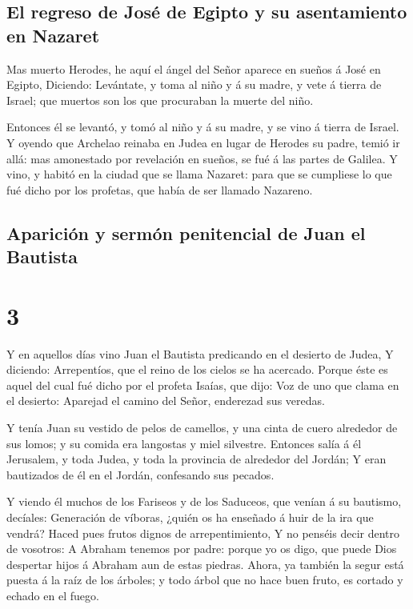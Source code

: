 \hypertarget{el-regreso-de-josuxe9-de-egipto-y-su-asentamiento-en-nazaret}{%
\subsection{El regreso de José de Egipto y su asentamiento en
Nazaret}\label{el-regreso-de-josuxe9-de-egipto-y-su-asentamiento-en-nazaret}}

 Mas muerto Herodes, he aquí el ángel del Señor aparece en
sueños á José en Egipto,  Diciendo: Levántate, y toma al
niño y á su madre, y vete á tierra de Israel; que muertos son los que
procuraban la muerte del niño.

 Entonces él se levantó, y tomó al niño y á su madre, y se
vino á tierra de Israel.  Y oyendo que Archelao reinaba en
Judea en lugar de Herodes su padre, temió ir allá: mas amonestado por
revelación en sueños, se fué á las partes de Galilea.  Y
vino, y habitó en la ciudad que se llama Nazaret: para que se cumpliese
lo que fué dicho por los profetas, que había de ser llamado Nazareno.

\hypertarget{apariciuxf3n-y-sermuxf3n-penitencial-de-juan-el-bautista}{%
\subsection{Aparición y sermón penitencial de Juan el
Bautista}\label{apariciuxf3n-y-sermuxf3n-penitencial-de-juan-el-bautista}}

\hypertarget{section-2}{%
\section{3}\label{section-2}}

 Y en aquellos días vino Juan el Bautista predicando en el
desierto de Judea,  Y diciendo: Arrepentíos, que el reino de
los cielos se ha acercado.  Porque éste es aquel del cual
fué dicho por el profeta Isaías, que dijo: Voz de uno que clama en el
desierto: Aparejad el camino del Señor, enderezad sus veredas.

 Y tenía Juan su vestido de pelos de camellos, y una cinta
de cuero alrededor de sus lomos; y su comida era langostas y miel
silvestre.  Entonces salía á él Jerusalem, y toda Judea, y
toda la provincia de alrededor del Jordán;  Y eran
bautizados de él en el Jordán, confesando sus pecados.

 Y viendo él muchos de los Fariseos y de los Saduceos, que
venían á su bautismo, decíales: Generación de víboras, ¿quién os ha
enseñado á huir de la ira que vendrá?  Haced pues frutos
dignos de arrepentimiento,  Y no penséis decir dentro de
vosotros: A Abraham tenemos por padre: porque yo os digo, que puede Dios
despertar hijos á Abraham aun de estas piedras.  Ahora, ya
también la segur está puesta á la raíz de los árboles; y todo árbol que
no hace buen fruto, es cortado y echado en el fuego.

